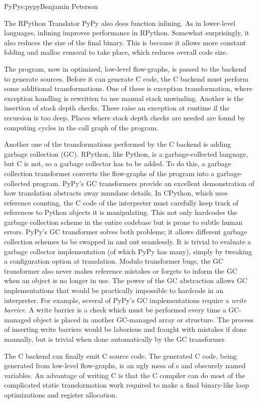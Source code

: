 \begin{aosachapter}{PyPy}{s:pypy}{Benjamin Peterson}
\begin{aosasect1}{The RPython Translator}
PyPy also does function inlining. As in lower-level languages, inlining improves
performance in RPython. Somewhat surprisingly, it also reduces the size of the
final binary. This is because it allows more constant folding and malloc removal
to take place, which reduces overall code size.

The program, now in optimized, low-level flow-graphs, is passed to the backend
to generate sources. Before it can generate C code, the C backend must perform
some additional transformations. One of these is exception transformation, where
exception handling is rewritten to use manual stack unwinding. Another is the
insertion of stack depth checks. These raise an exception at runtime if the
recursion is too deep. Places where stack depth checks are needed are found by
computing cycles in the call graph of the program.

Another one of the transformations performed by the C backend is adding garbage
collection (GC). RPython, like Python, is a garbage-collected
language, but C is not, so a garbage collector has to be added. To do this, a
garbage collection transformer converts the flow-graphs of the program into a
garbage-collected program. PyPy's GC transformers provide an excellent
demonstration of how translation abstracts away mundane details. In CPython,
which uses reference counting, the C code of the interpreter must carefully keep
track of references to Python objects it is manipulating. This not only
hardcodes the garbage collection scheme in the entire codebase but is prone to
subtle human errors. PyPy's GC transformer solves both problems; it allows
different garbage collection schemes to be swapped in and out seamlessly. It is
trivial to evaluate a garbage collector implementation (of which PyPy has many),
simply by tweaking a configuration option at translation. Modulo transformer
bugs, the GC transformer also never makes reference mistakes or forgets to
inform the GC when an object is no longer in use. The power of the GC
abstraction allows GC implementations that would be practically impossible to
hardcode in an interpreter. For example, several of PyPy's GC implementations
require a \emph{write barrier}. A write barrier is a check which must be
performed every time a GC-managed object is placed in another GC-managed array
or structure. The process of inserting write barriers would be laborious and
fraught with mistakes if done manually, but is trivial when done automatically by
the GC transformer.

The C backend can finally emit C source code. The generated C code, being
generated from low-level flow-graphs, is an ugly mess of s and obscurely
named variables. An advantage of writing C is that the C compiler can do most of
the complicated static transformation work required to make a final binary-like
loop optimizations and register allocation.


\end{aosasect1}
\end{aosachapter}
